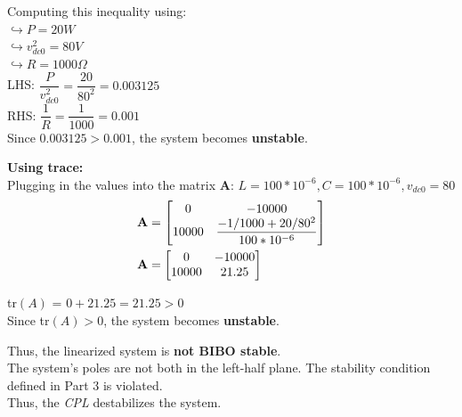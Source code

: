 \documentclass[12pt]{article}
\begin{document}
\begin{tcolorbox}[enhanced, frame hidden, colback=white, borderline west={1pt}{0pt}{gray}]
  Computing this inequality using:\\
  $\hookrightarrow P = 20W$\\
  $\hookrightarrow v^2_{dc0} = 80V$\\
  $\hookrightarrow R = 1000\Omega$\\

  LHS: $\dfrac{P}{v^2_{dc0}} = \dfrac{20}{80^2} = 0.003125$\\

  RHS: $\dfrac{1}{R} = \dfrac{1}{1000} = 0.001$\\

  Since $0.003125 > 0.001$, the system becomes \textbf{unstable}.

  \begin{tcolorbox}[enhanced, frame hidden, colback=white, borderline west={1pt}{0pt}{gray}]
    \textbf{Using trace:}\\
    Plugging in the values into the matrix \textbf{A}: $L = 100 * 10^{-6}, C = 100 * 10^{-6}, v_{dc0} = 80$\\

    \begin{align*}
      \text{\textbf{A}} &= \begin{bmatrix}
        0 & -10000\\
        10000 & \dfrac{-1/1000 + 20/80^2}{100*10^{-6}}\\
      \end{bmatrix}\\
      \text{\textbf{A}} &= \begin{bmatrix}
        0 & -10000\\
        10000 & 21.25\\
      \end{bmatrix}
    \end{align*}

    tr$(A)$ = $0 + 21.25 = 21.25 > 0$\\

    Since tr$(A) > 0$, the system becomes \textbf{unstable}.
  \end{tcolorbox}

  Thus, the linearized system is \textbf{not BIBO stable}.\\
  The system's poles are not both in the left-half plane. The stability condition defined in Part 3 is violated. \\

  Thus, the \textit{CPL} destabilizes the system.\\
\end{tcolorbox}
\end{document}
